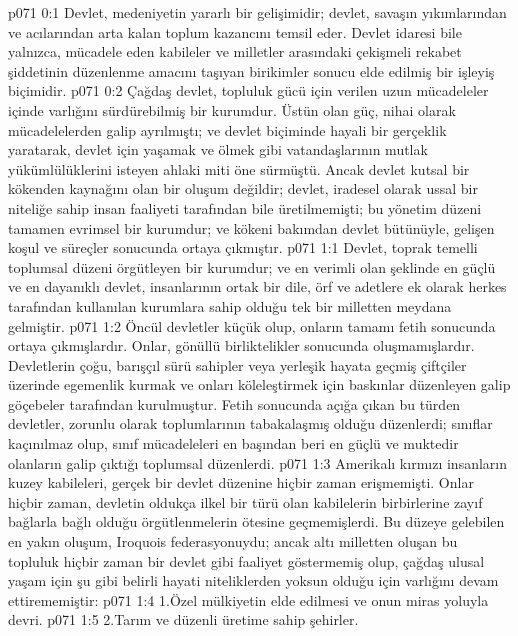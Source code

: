 \vs p071 0:1 Devlet, medeniyetin yararlı bir gelişimidir; devlet, savaşın yıkımlarından ve acılarından arta kalan toplum kazancını temsil eder. Devlet idaresi bile yalnızca, mücadele eden kabileler ve milletler arasındaki çekişmeli rekabet şiddetinin düzenlenme amacını taşıyan birikimler sonucu elde edilmiş bir işleyiş biçimidir.
\vs p071 0:2 Çağdaş devlet, topluluk gücü için verilen uzun mücadeleler içinde varlığını sürdürebilmiş bir kurumdur. Üstün olan güç, nihai olarak mücadelelerden galip ayrılmıştı; ve devlet biçiminde hayali bir gerçeklik yaratarak, devlet için yaşamak ve ölmek gibi vatandaşlarının mutlak yükümlülüklerini isteyen ahlaki miti öne sürmüştü. Ancak devlet kutsal bir kökenden kaynağını olan bir oluşum değildir; devlet, iradesel olarak ussal bir niteliğe sahip insan faaliyeti tarafından bile üretilmemişti; bu yönetim düzeni tamamen evrimsel bir kurumdur; ve kökeni bakımdan devlet bütünüyle, gelişen koşul ve süreçler sonucunda ortaya çıkmıştır.
\vs p071 1:1 Devlet, toprak temelli toplumsal düzeni örgütleyen bir kurumdur; ve en verimli olan şeklinde en güçlü ve en dayanıklı devlet, insanlarının ortak bir dile, örf ve adetlere ek olarak herkes tarafından kullanılan kurumlara sahip olduğu tek bir milletten meydana gelmiştir.
\vs p071 1:2 Öncül devletler küçük olup, onların tamamı fetih sonucunda ortaya çıkmışlardır. Onlar, gönüllü birliktelikler sonucunda oluşmamışlardır. Devletlerin çoğu, barışçıl sürü sahipler veya yerleşik hayata geçmiş çiftçiler üzerinde egemenlik kurmak ve onları köleleştirmek için baskınlar düzenleyen galip göçebeler tarafından kurulmuştur. Fetih sonucunda açığa çıkan bu türden devletler, zorunlu olarak toplumlarının tabakalaşmış olduğu düzenlerdi; sınıflar kaçınılmaz olup, sınıf mücadeleleri en başından beri en güçlü ve muktedir olanların galip çıktığı toplumsal düzenlerdi.
\vs p071 1:3 Amerikalı kırmızı insanların kuzey kabileleri, gerçek bir devlet düzenine hiçbir zaman erişmemişti. Onlar hiçbir zaman, devletin oldukça ilkel bir türü olan kabilelerin birbirlerine zayıf bağlarla bağlı olduğu örgütlenmelerin ötesine geçmemişlerdi. Bu düzeye gelebilen en yakın oluşum, Iroquois federasyonuydu; ancak altı milletten oluşan bu topluluk hiçbir zaman bir devlet gibi faaliyet göstermemiş olup, çağdaş ulusal yaşam için şu gibi belirli hayati niteliklerden yoksun olduğu için varlığını devam ettirememiştir:
\vs p071 1:4 1.\bibnobreakspace Özel mülkiyetin elde edilmesi ve onun miras yoluyla devri.
\vs p071 1:5 2.\bibnobreakspace Tarım ve düzenli üretime sahip şehirler.
